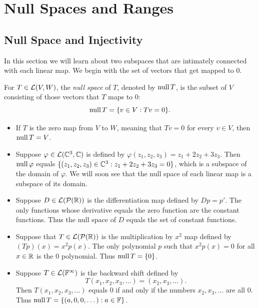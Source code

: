 \section{Null Spaces and Ranges}

\subsection{Null Space and Injectivity}

In this section we will learn about two subspaces that are intimately
connected with each linear map. We begin with the set of vectors that get
mapped to $0$.

\begin{definition}\label{ax:3.11}
For $T\in\mathcal{L}(V,W)$, the \emph{null space} of $T$, denoted by $\operatorname{null} T$, is
the subset of $V$ consisting of those vectors that $T$ maps to $0$:
\[ \operatorname{null} T=\{v\in V : Tv=0\}. \]
\end{definition}

%
\begin{example}\label{ax:3.12}\leavevmode
\begin{itemize}
\item If $T$ is the zero map from $V$ to $W$, meaning that $Tv=0$ for every
  $v\in V$, then $\operatorname{null} T=V$.
\item Suppose $\varphi\in\mathcal{L}(\mathbb{C}^3,\mathbb{C})$ is defined by
  $\varphi(z_1,z_2,z_3)=z_1+2z_2+3z_3$. Then $\operatorname{null}\varphi$ equals
  $\{(z_1,z_2,z_3)\in\mathbb{C}^3 : z_1+2z_2+3z_3=0\}$, which is a subspace of the
  domain of $\varphi$. We will soon see that the null space of each linear map
  is a subspace of its domain.
\item Suppose $D\in\mathcal{L}(\mathcal{P}(\mathbb{R}))$ is the differentiation map defined by
  $Dp=p'$. The only functions whose derivative equals the zero function are
  the constant functions. Thus the null space of $D$ equals the set of
  constant functions.
\item Suppose that $T\in\mathcal{L}(\mathcal{P}(\mathbb{R}))$ is the multiplication by $x^2$ map
  defined by $(Tp)(x)=x^2p(x)$. The only polynomial $p$ such that
  $x^2p(x)=0$ for all $x\in\mathbb{R}$ is the $0$ polynomial. Thus $\operatorname{null} T=\{0\}$.
\item Suppose $T\in\mathcal{L}(\mathbb{F}^\infty)$ is the backward shift defined by
  \[ T(x_1,x_2,x_3,\dots)=(x_2,x_3,\dots). \]
  Then $T(x_1,x_2,x_3,\dots)$ equals $0$ if and only if the numbers
  $x_2,x_3,\dots$ are all $0$. Thus $\operatorname{null} T=\{(a,0,0,\dots) : a\in\mathbb{F}\}$.
\end{itemize}
\end{example}

